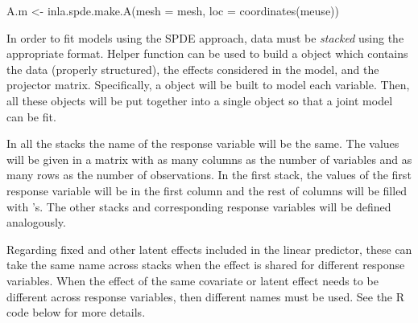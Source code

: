 \begin{example*}
A.m <- inla.spde.make.A(mesh = mesh, loc = coordinates(meuse))
\end{example*}



\medskip
In order to fit models using the SPDE approach, data must be \textit{stacked} using the appropriate format. Helper function  can be used to build a  object which contains the data (properly structured), the effects considered in the model, and the projector matrix. Specifically, a  object will be built to model each variable. Then, all these objects will be put together into a single  object so that a joint model can be fit.

\medskip
In all the stacks the name of the response variable will be the same. The values will be given in a matrix with as many columns as the number of variables and as many rows as the number of observations. In the first stack, the values of the first response variable will be in the first column and the rest of columns will be filled with 's. The other stacks and corresponding response variables will be defined analogously.


\medskip
Regarding fixed and other latent effects included in the linear predictor, these can take
the same name across stacks when the effect is shared for different
response variables. When the effect of the same covariate or latent effect
needs to be different across response variables, then different names must be used. See the R code below for more details.



%
%
%
%
%
%
%

